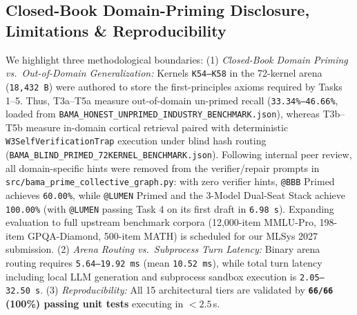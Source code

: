 \documentclass[10pt,twocolumn,letterpaper]{article}
\begin{document}
\subsection{Closed-Book Domain-Priming Disclosure, Limitations \& Reproducibility}
We highlight three methodological boundaries: (1) \textit{Closed-Book Domain Priming vs.\ Out-of-Domain Generalization:} Kernels \texttt{K54--K58} in the 72-kernel arena (\texttt{18,432\,B}) were authored to store the first-principles axioms required by Tasks 1--5. Thus, T3a--T5a measure out-of-domain un-primed recall (\texttt{33.34\%--46.66\%}, loaded from \texttt{BAMA\_HONEST\_UNPRIMED\_INDUSTRY\_BENCHMARK.json}), whereas T3b--T5b measure in-domain cortical retrieval paired with deterministic \texttt{W3SelfVerificationTrap} execution under blind hash routing (\texttt{BAMA\_BLIND\_PRIMED\_72KERNEL\_BENCHMARK.json}). Following internal peer review, all domain-specific hints were removed from the verifier/repair prompts in \texttt{src/bama\_prime\_collective\_graph.py}: with zero verifier hints, \texttt{@BBB} Primed achieves \texttt{60.00\%}, while \texttt{@LUMEN} Primed and the 3-Model Dual-Seat Stack achieve \texttt{100.00\%} (with \texttt{@LUMEN} passing Task 4 on its first draft in \texttt{6.98\,s}). Expanding evaluation to full upstream benchmark corpora (12,000-item MMLU-Pro, 198-item GPQA-Diamond, 500-item MATH) is scheduled for our MLSys 2027 submission. (2) \textit{Arena Routing vs.\ Subprocess Turn Latency:} Binary arena routing requires \texttt{5.64--19.92\,ms} (mean \texttt{10.52\,ms}), while total turn latency including local LLM generation and subprocess sandbox execution is \texttt{2.05--32.50\,s}. (3) \textit{Reproducibility:} All 15 architectural tiers are validated by \textbf{\texttt{66/66} (100\%) passing unit tests} executing in $<2.5$\,s.
\end{document}
